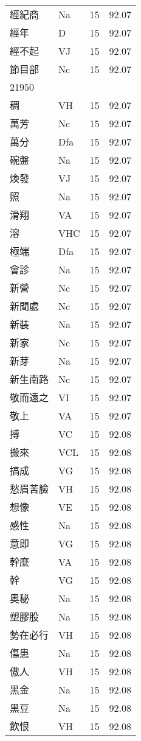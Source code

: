 \documentclass[twocolumn]{book}
\begin{document}
\begin{supertabular}{llrr}
經紀商 & Na & 15 &  92.07\\
經年 & D & 15 &  92.07\\
經不起 & VJ & 15 &  92.07\\
節目部 & Nc & 15 &  92.07\\
21950\\
稠 & VH & 15 &  92.07\\
萬芳 & Nc & 15 &  92.07\\
萬分 & Dfa & 15 &  92.07\\
碗盤 & Na & 15 &  92.07\\
煥發 & VJ & 15 &  92.07\\
照 & Na & 15 &  92.07\\
滑翔 & VA & 15 &  92.07\\
溶 & VHC & 15 &  92.07\\
極端 & Dfa & 15 &  92.07\\
會診 & Na & 15 &  92.07\\
新營 & Nc & 15 &  92.07\\
新聞處 & Nc & 15 &  92.07\\
新裝 & Na & 15 &  92.07\\
新家 & Nc & 15 &  92.07\\
新芽 & Na & 15 &  92.07\\
新生南路 & Nc & 15 &  92.07\\
敬而遠之 & VI & 15 &  92.07\\
敬上 & VA & 15 &  92.07\\
搏 & VC & 15 &  92.08\\
搬來 & VCL & 15 &  92.08\\
搞成 & VG & 15 &  92.08\\
愁眉苦臉 & VH & 15 &  92.08\\
想像 & VE & 15 &  92.08\\
感性 & Na & 15 &  92.08\\
意即 & VG & 15 &  92.08\\
幹麼 & VA & 15 &  92.08\\
幹 & VG & 15 &  92.08\\
奧秘 & Na & 15 &  92.08\\
塑膠股 & Na & 15 &  92.08\\
勢在必行 & VH & 15 &  92.08\\
傷患 & Na & 15 &  92.08\\
傲人 & VH & 15 &  92.08\\
黑金 & Na & 15 &  92.08\\
黑豆 & Na & 15 &  92.08\\
飲恨 & VH & 15 &  92.08\\

\end{supertabular}
\end{document}
